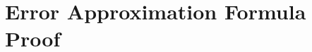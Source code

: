 \documentclass[12pt]{article}
\begin{document}


\label{sec:conc}






\newpage

\clearpage
\appendix


\section{Error Approximation Formula Proof}
\label{sec:error-bound-formula}
\end{document}
